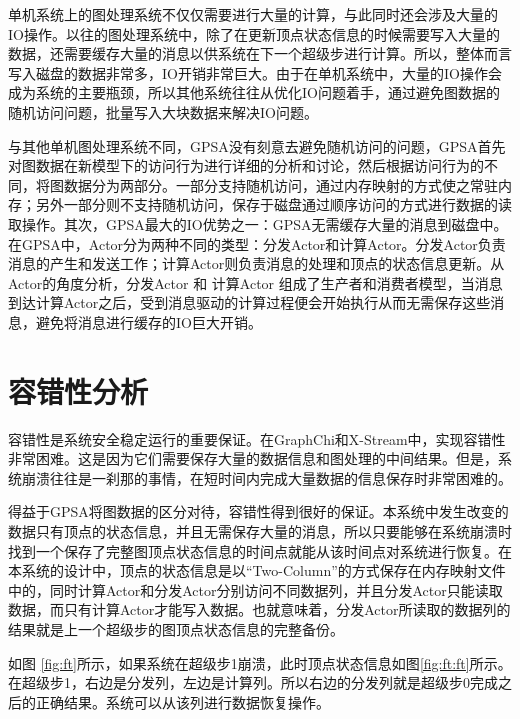 单机系统上的图处理系统不仅仅需要进行大量的计算，与此同时还会涉及大量的IO操作。以往的图处理系统中，除了在更新顶点状态信息的时候需要写入大量的数据，还需要缓存大量的消息以供系统在下一个超级步进行计算。所以，整体而言写入磁盘的数据非常多，IO开销非常巨大。由于在单机系统中，大量的IO操作会成为系统的主要瓶颈，所以其他系统往往从优化IO问题着手，通过避免图数据的随机访问问题，批量写入大块数据来解决IO问题。

与其他单机图处理系统不同，GPSA没有刻意去避免随机访问的问题，GPSA首先对图数据在新模型下的访问行为进行详细的分析和讨论，然后根据访问行为的不同，将图数据分为两部分。一部分支持随机访问，通过内存映射的方式使之常驻内存；另外一部分则不支持随机访问，保存于磁盘通过顺序访问的方式进行数据的读取操作。其次，GPSA最大的IO优势之一：GPSA无需缓存大量的消息到磁盘中。在GPSA中，Actor分为两种不同的类型：分发Actor和计算Actor。分发Actor负责消息的产生和发送工作；计算Actor则负责消息的处理和顶点的状态信息更新。从Actor的角度分析，分发Actor 和 计算Actor 组成了生产者和消费者模型，当消息到达计算Actor之后，受到消息驱动的计算过程便会开始执行从而无需保存这些消息，避免将消息进行缓存的IO巨大开销。

\section{容错性分析}

容错性是系统安全稳定运行的重要保证。在GraphChi和X-Stream中，实现容错性非常困难。这是因为它们需要保存大量的数据信息和图处理的中间结果。但是，系统崩溃往往是一刹那的事情，在短时间内完成大量数据的信息保存时非常困难的。

得益于GPSA将图数据的区分对待，容错性得到很好的保证。本系统中发生改变的数据只有顶点的状态信息，并且无需保存大量的消息，所以只要能够在系统崩溃时找到一个保存了完整图顶点状态信息的时间点就能从该时间点对系统进行恢复。在本系统的设计中，顶点的状态信息是以“Two-Column”的方式保存在内存映射文件中的，同时计算Actor和分发Actor分别访问不同数据列，并且分发Actor只能读取数据，而只有计算Actor才能写入数据。也就意味着，分发Actor所读取的数据列的结果就是上一个超级步的图顶点状态信息的完整备份。

如图 \ref{fig:ft}所示，如果系统在超级步1崩溃，此时顶点状态信息如图\ref{fig:ft:ft}所示。在超级步1，右边是分发列，左边是计算列。所以右边的分发列就是超级步0完成之后的正确结果。系统可以从该列进行数据恢复操作。

